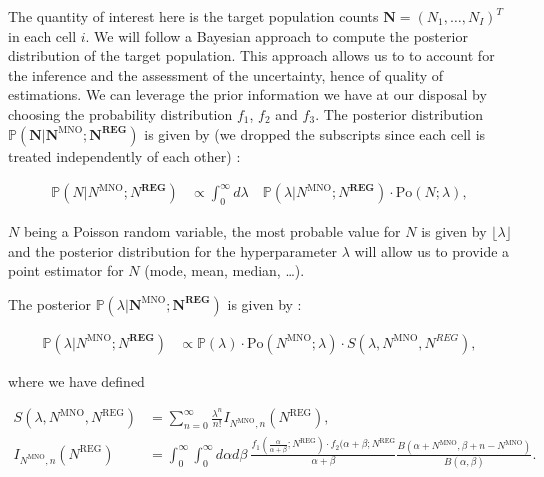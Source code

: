 \documentclass[12pt, a4paper]{article}
\begin{document}
The quantity of interest here is the target population counts $\mathbf{N}=(N_{1},\dots,N_{I})^{T}$ in each cell $i$. We will follow a Bayesian
approach to compute the posterior distribution of the target population. This approach allows us to 
to account for the inference and the assessment of the uncertainty, hence of quality of estimations.
We can leverage the prior information we have at our disposal by choosing the probability distribution $f_{1}$, $f_{2}$ and $f_{3}$. 
The posterior distribution $\mathbb{P}\left(\mathbf{N}\big|\mathbf{N}^{\textrm{MNO}};\mathbf{N}^{\textbf{REG}}\right)$ is given by (we dropped the subscripts
since each cell is treated independently of each other) \cite{methodology}:

\begin{align}
\mathbb{P}\left(N\big|N^{\textrm{MNO}};N^{\textbf{REG}}\right)&\propto 
\label{PostProbN} \int_{0}^{\infty}d\lambda\quad\mathbb{P}\left(\lambda\big|N^{\textrm{MNO}};N^{\textbf{REG}}\right)\cdot\textrm{Po}(N; \lambda),
\end{align}

$N$ being a Poisson random variable, the most probable value for $N$ is given by $\lfloor \lambda\rfloor$ and the posterior 
distribution for the hyperparameter $\lambda$ will allow us to provide a point estimator for $N$ (mode, mean, median, \dots).

The posterior $\mathbb{P}\left(\lambda \big|\mathbf{N}^{\textrm{MNO}};\mathbf{N}^{\textbf{REG}}\right)$ is given by \cite{BDA3} \cite{methodology}:

\begingroup\small
\begin{align}
\mathbb{P}\left(\lambda\big|N^{\textrm{MNO}};N^{\textbf{REG}}\right)&\propto \mathbb{P}\left(\lambda\right)\cdot \textrm{Po}(N^{\textrm{MNO}}; \lambda) \cdot S\left(\lambda, N^{\textrm{MNO}}, N^{REG}\right),
\end{align}
\endgroup

\noindent where we have defined 

\begingroup\small
\begin{align}
S(\lambda, N^{\textrm{MNO}}, N^{\textrm{REG}}) &= \sum_{n = 0}^{\infty}\frac{\lambda^{n}}{n!}I_{N^{\textrm{MNO}}, n}(N^{\textrm{REG}}),\\
I_{N^{\textrm{MNO}}, n}(N^{\textrm{REG}})&=\int_{0}^{\infty}\int_{0}^{\infty}d\alpha d\beta\ \frac{f_{1}(\frac{\alpha}{\alpha+\beta}; N^{\textrm{REG}})\cdot f_{2}(\alpha+\beta; N^{\textrm{REG}}}{\alpha+\beta}\frac{B\left(\alpha+N^{\textrm{MNO}}, \beta+n- N^{\textrm{MNO}}\right)}{B\left(\alpha, \beta\right)}.
\end{align}
\endgroup
\end{document}
